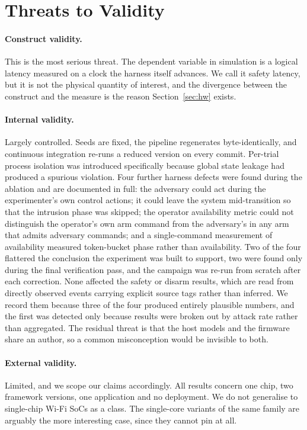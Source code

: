 \section{Threats to Validity}\label{sec:threats}

\paragraph{Construct validity.} This is the most serious threat. The dependent variable in
simulation is a logical latency measured on a clock the harness itself advances. We call it
safety latency, but it is not the physical quantity of interest, and the divergence between the
construct and the measure is the reason Section~\ref{sec:hw} exists.

\paragraph{Internal validity.} Largely controlled. Seeds are fixed, the pipeline regenerates
byte-identically, and continuous integration re-runs a reduced version on every commit.
Per-trial process isolation was introduced specifically because global state leakage had produced
a spurious violation. Four further harness defects were found during the ablation and
are documented in full: the adversary could act during the experimenter's own control actions;
it could leave the system mid-transition so that the intrusion phase was skipped; the operator
availability metric could not distinguish the operator's own arm command from the adversary's
in any arm that admits adversary commands; and a single-command measurement of availability
measured token-bucket phase rather than availability. Two of the four flattered the conclusion
the experiment was built to support, two were found only during the final verification pass,
and the campaign was re-run from scratch after each correction. None affected the safety or
disarm results, which are read from directly observed events carrying explicit source tags
rather than inferred. We record them because three of the four produced entirely plausible
numbers, and the first was detected only because results were broken out by attack rate rather
than aggregated. The residual threat is that the host models and the firmware share an author,
so a common misconception would be invisible to both.

\paragraph{External validity.} Limited, and we scope our claims accordingly. All results concern
one chip, two framework versions, one application and no deployment. We do not generalise to
single-chip Wi-Fi SoCs as a class. The single-core variants of the same family are arguably the
more interesting case, since they cannot pin at all.

